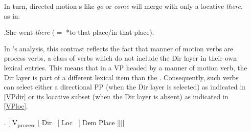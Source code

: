 In turn, directed motion s like \textit{go} or \textit{come} will merge with only a locative \textit{there}, as in:

\ex.\label{loc-there}She went \textit{there} ($=$ *to that place/in that place).\label{shewent}

\noindent In \citeauthor{GVW-Olinco}'s \citeyearpar{GVW-Olinco} analysis, this contrast reflects the fact that manner of motion verbs are process verbs, a class of verbs which do not include the Dir layer in their own lexical entries. This means that in a VP headed by a manner of motion verb, the Dir layer is part of a different lexical item than the . Consequently, such verbs can select either a directional PP (when the Dir layer is selected) as indicated in \ref{VPdir} or its locative subset (when the Dir layer is absent) as indicated in \ref{VPloc}.\largerpage[-1]

\ex. [ V\textsubscript{process} [ Dir \ [ Loc \ [ Dem Place ]]]]\label{VPdir}

